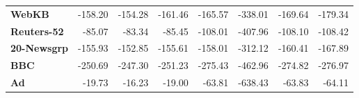 \documentclass[10pt, t, xcolor={usenames,dvipsnames,svgnames}, compress]{beamer}
\begin{document}
\begin{frame}[t]
\begin{table}
\begin{tabular}{l r r r r r r r}
      \textbf{WebKB}      & -158.20 & -154.28 & -161.46 & -165.57 & -338.01 & -169.64 & -179.34 \\
      \textbf{Reuters-52} & -85.07  & -83.34  & -85.45  & -108.01 & -407.96 & -108.10 & -108.42 \\
      \textbf{20-Newsgrp} & -155.93 & -152.85 & -155.61 & -158.01 & -312.12 & -160.41 & -167.89 \\
      \textbf{BBC}        & -250.69 & -247.30 & -251.23 & -275.43 & -462.96 & -274.82 & -276.97 \\
      \textbf{Ad}         & -19.73  & -16.23  & -19.00  & -63.81  & -638.43 & -63.83  & -64.11  \\
      \bottomrule
    \end{tabular}
    \label{tab:model-accs}
  \end{table}

\end{frame}
\end{document}
